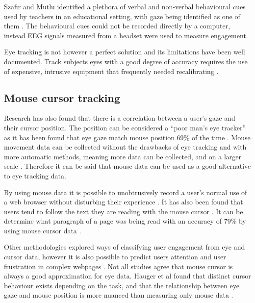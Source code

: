 \documentclass{article}
\begin{document}
Szafir and Mutlu identified a plethora of verbal and non-verbal behavioural cues used by teachers in an educational setting, with gaze being identified as one of them \cite{szafir2012pay}.
The behavioural cues could not be recorded directly by a computer, instead EEG signals measured from a headset were used to measure engagement.

Eye tracking is not however a perfect solution and its limitations have been well documented. 
Track subjects eyes with a good degree of accuracy requires the use of expensive, intrusive equipment that frequently needed recalibrating \cite{richardson2004eye}. 


\subsection{Mouse cursor tracking}

Research has also found that there is a correlation between a user’s gaze and their cursor position. 
The position can be considered a ``poor man’s eye tracker'' as it has been found that eye gaze match mouse position 69\% of the time \cite{cooke2006mouse}. 
Mouse movement data can be collected without the drawbacks of eye tracking and with more automatic methods, meaning more data can be collected, and on a larger scale \cite{demvsar2017quantifying}.
Therefore it can be said that mouse data can be used as a good alternative to eye tracking data.

By using mouse data it is possible to unobtrusively record a user’s normal use of a web browser without disturbing their experience \cite{goecks2000learning}.
It has also been found that users tend to follow the text they are reading with the mouse cursor \cite{liu2007detecting}. 
It can be determine what paragraph of a page was being read with an accuracy of 79\% by using mouse cursor data \cite{hauger2011using}. 

Other methodologies explored ways of classifying user engagement from eye and cursor data, however it is also possible to predict users attention and user frustration in complex webpages \cite{navalpakkam2012mouse}.
Not all studies agree that mouse cursor is always a good approximation for eye data. 
Hauger et al found that distinct cursor behaviour exists depending on the task, and that the relationship between eye gaze and mouse position is more nuanced than measuring only mouse data \cite{huang2012user}.
\end{document}
